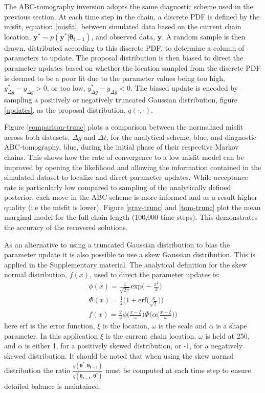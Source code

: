 The ABC-tomography inversion adopts the same diagnostic scheme used in the previous section. At each time step in the chain, a discrete PDF is defined by the misfit, equation \ref{misfit}, between simulated data based on the current chain location, $\bm{y^*} \sim p(\bm{y^*}|\bm{\theta_{t-1}})$,  and observed data, $\bm{y}$. A random sample is then drawn, distributed according to this discrete PDF, to determine a column of parameters to update. The proposal distribution is then biased to direct the parameter updates based on whether the location sampled from the discrete PDF is deemed to be a poor fit due to the parameter values being too high, $y^*_{\Delta g} - y_{\Delta g} > 0$, or too low,  $y^*_{\Delta g} - y_{\Delta g} < 0$. The biased update is encoded by sampling a positively or negatively truncated Gaussian distribution, figure \ref{updates}, as the proposal distribution, $q(\cdot,\cdot)$.\par

Figure \ref{comparison-trunc} plots a comparison between the normalized misfit across both datasets, $\Delta g$ and $\Delta t$, for the analytical scheme, blue, and diagnostic ABC-tomography, blue, during the initial phase of their respective Markov chains. This shows how the rate of convergence to a low misfit model can be improved by opening the likelihood and allowing the information contained in the simulated dataset to localize and direct parameter updates. While acceptance rate is particularly low compared to sampling of the analytically defined posterior, each move in the ABC scheme is more informed and as a result higher quality (i.e the misfit is lower). Figure \ref{grav-trunc} and \ref{tom-trunc} plot the mean marginal model for the full chain length (100,000 time steps). This demonstrates the accuracy of the recovered solutions.\par

As an alternative to using a truncated Gaussian distribution to bias the parameter update it is also possible to use a skew Gaussian distribution. This is applied in the Supplementary material. The analytical definition for the skew normal distribution, $f(x)$, used to direct the parameter updates is:
\begin{equation}
\begin{split}
\phi(x) = \frac{1}{\sqrt{2\pi}}\text{exp}\Big(-\frac{x^2}{2}\Big) \\
\Phi(x) = \frac{1}{2}\bigg(1 + \text{erf}\Big(\frac{x}{\sqrt{2}}\Big)\bigg)\\
f(x) = \frac{2}{\omega} \phi\bigg(\frac{x-\xi}{\omega}\bigg)\Phi\bigg(\alpha \Big(\frac{x-\xi}{\omega}\Big)\bigg)
\end{split}
\end{equation}
here erf is the error function, $\xi$ is the location, $\omega$ is the scale and $\alpha$ is a shape parameter. In this application  $\xi$ is the current chain location, $\omega$ is held at 250, and $\alpha$ is either 1, for a positively skewed distribution, or -1, for a negatively skewed distribution. It should be noted that when using the skew normal distribution the ratio $\frac{q(\bm{\theta^*},\bm{\theta_{t-1}})}{q(\bm{\theta_{t-1}},\bm{\theta^*})}$ must be computed at each time step to ensure detailed balance is maintained.

